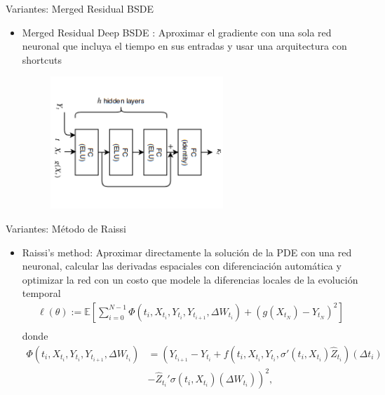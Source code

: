 \documentclass[aspectratio=169,xcolor=dvipsnames]{beamer}
\begin{document}
\begin{frame}{Variantes: Merged Residual BSDE}
		\begin{itemize}
		\item Merged Residual Deep BSDE \parencite{chan-wai-nam_machine_2018}: Aproximar el gradiente con una sola red neuronal que incluya el tiempo en sus entradas y usar una arquitectura con shortcuts
		\begin{figure}
			\centering
			\includegraphics[width=0.6\linewidth,height=5cm]{images/Residual.png}
			\label{fig:residualmergedstructure}
		\end{figure}
	\end{itemize}
\end{frame}

\begin{frame}{Variantes: Método de Raissi}
	\begin{itemize}
		\item Raissi's method\parencite{raissi_forward-backward_2018}: Aproximar directamente la solución de la PDE con una red neuronal, calcular las derivadas espaciales con diferenciación automática y optimizar la red con un costo que modele la diferencias locales de la evolución temporal  
	\begin{equation}
		\begin{gathered}
			\ell(\theta):=\mathbb{E}\left[\sum_{i=0}^{N-1} \Phi\left(t_i, X_{t_i}, Y_{t_i}, Y_{t_{i+1}}, \Delta W_{t_{i}}\right)+\left(g\left(X_{t_N}\right)-Y_{t_N}\right)^2\right] \\
		\end{gathered}
	\end{equation}
	donde
	\begin{equation}
		\begin{split}
			\Phi\left(t_i, X_{t_i}, Y_{t_i}, Y_{t_{i+1}}, \Delta W_{t_i}\right)&=\left(Y_{t_{i+1}}-Y_{t_i}+f\left(t_i, X_{t_i}, Y_{t_i}, \sigma'\left(t_i, X_{t_i}\right) \widehat{Z}_{t_i}\right)\left(\Delta t_i\right)\right. \\
			&\left.-\widehat{Z}_{t_i}' \sigma\left(t_i, X_{t_i}\right)\left(\Delta W_{t_i}\right)\right)^2,
		\end{split}
	\end{equation}
	\end{itemize}
\end{frame}
\end{document}
